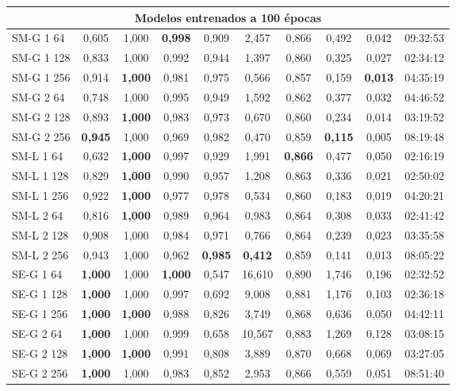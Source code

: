 \begin{longtable}{lccccccccc}
\multicolumn{10}{c}{\textbf{Modelos entrenados a 100 épocas}} \\
\midrule
SM-G 1 64 & 0,605 & 1,000 & \textbf{0,998} & 0,909 & 2,457 & 0,866 & 0,492 & 0,042 & 09:32:53\\
SM-G 1 128 & 0,833 & 1,000 & 0,992 & 0,944 & 1,397 & 0,860 & 0,325 & 0,027 & 02:34:12\\
SM-G 1 256 & 0,914 & \textbf{1,000} & 0,981 & 0,975 & 0,566 & 0,857 & 0,159 & \textbf{0,013} & 04:35:19\\
SM-G 2 64 & 0,748 & 1,000 & 0,995 & 0,949 & 1,592 & 0,862 & 0,377 & 0,032 & 04:46:52\\
SM-G 2 128 & 0,893 & \textbf{1,000} & 0,983 & 0,973 & 0,670 & 0,860 & 0,234 & 0,014 & 03:19:52\\
SM-G 2 256 & \textbf{0,945} & 1,000 & 0,969 & 0,982 & 0,470 & 0,859 & \textbf{0,115} & 0,005 & 08:19:48\\
SM-L 1 64 & 0,632 & \textbf{1,000} & 0,997 & 0,929 & 1,991 & \textbf{0,866} & 0,477 & 0,050 & 02:16:19\\
SM-L 1 128 & 0,829 & \textbf{1,000} & 0,990 & 0,957 & 1,208 & 0,863 & 0,336 & 0,021 & 02:50:02\\
SM-L 1 256 & 0,922 & \textbf{1,000} & 0,977 & 0,978 & 0,534 & 0,860 & 0,183 & 0,019 & 04:20:21\\
SM-L 2 64 & 0,816 & \textbf{1,000} & 0,989 & 0,964 & 0,983 & 0,864 & 0,308 & 0,033 & 02:41:42\\
SM-L 2 128 & 0,908 & 1,000 & 0,984 & 0,971 & 0,766 & 0,864 & 0,239 & 0,023 & 03:35:58\\
SM-L 2 256 & 0,943 & 1,000 & 0,962 & \textbf{0,985} & \textbf{0,412} & 0,859 & 0,141 & 0,013 & 08:05:22\\
\midrule
SE-G 1 64 & \textbf{1,000} & 1,000 & \textbf{1,000} & 0,547 & 16,610 & 0,890 & 1,746 & 0,196 & 02:32:52\\
SE-G 1 128 & \textbf{1,000} & 1,000 & 0,997 & 0,692 & 9,008 & 0,881 & 1,176 & 0,103 & 02:36:18\\
SE-G 1 256 & \textbf{1,000} & \textbf{1,000} & 0,988 & 0,826 & 3,749 & 0,868 & 0,636 & 0,050 & 04:42:11\\
SE-G 2 64 & \textbf{1,000} & 1,000 & 0,999 & 0,658 & 10,567 & 0,883 & 1,269 & 0,128 & 03:08:15\\
SE-G 2 128 & \textbf{1,000} & \textbf{1,000} & 0,991 & 0,808 & 3,889 & 0,870 & 0,668 & 0,069 & 03:27:05\\
SE-G 2 256 & \textbf{1,000} & 1,000 & 0,983 & 0,852 & 2,953 & 0,866 & 0,559 & 0,051 & 08:51:40\\

\end{longtable}
